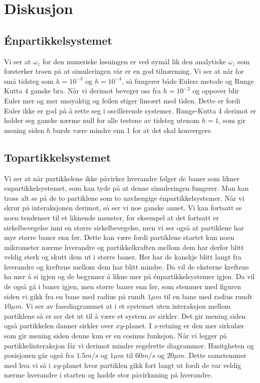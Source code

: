 \documentclass[reprint,english,notitlepage]{revtex4-1}  %
\begin{document}
\section{Diskusjon}
\subsection*{Énpartikkelsystemet}
Vi ser at $\omega_z$ for den numeriske løsningen er ved øymål lik den analytiske $\omega_z$ som forsterker troen på at simuleringen vår er en god tilnærming.
Vi ser at når for små tidsteg som $h=10^{-3}$ og $h=10^{-4}$, så fungerer både Eulers metode og Runge Kutta 4 ganske bra. Når vi derimot beveger oss fra $h=10^{-2}$ og oppover blir Euler mer og mer unøyaktig og feilen stiger lineært med tiden. Dette er fordi Euler ikke er god på å rette seg i oscillerende systemer.
\newline Runge-Kutta 4 derimot er holder seg ganske nærme null for alle testene av tidsteg utenom $h=1$, som gir mening siden $h$ burde være mindre enn 1 for at det skal konvergere.
\subsection*{Topartikkelsystemet}
Vi ser at når partikkelene ikke påvirker hverandre følger de baner som likner enpartikkelsystemet, som kan tyde på at denne simuleringen fungerer. Man kan tross alt se på de to partiklene som to uavhengige énpartikkelsystemer. Når vi skrur på interaksjonen derimot, så ser vi noe ganske annet. Vi kan fortsatt se noen tendenser til et liknende mønster, for eksempel at det fortsatt er sirkelbevegelse inni en større sirkelbevegelse, men vi ser også at partiklene har mye større baner enn før. Dette kan være fordi partiklene startet kun noen mikrometer nærme hverandre og partikkelkraften mellom dem har derfor blitt veldig sterk og skutt dem ut i større baner. Her har de kanskje blitt langt fra hverandre og kreftene mellom dem har blitt mindre. Da vil de eksterne kreftene ha mer å si igjen og de begynner å likne mer på énpartikkelsystemer igjen. Da vil de også gå i baner igjen, men større baner enn før, som stemmer med figuren siden vi gikk fra en bane med radius på rundt $1\mu m$ til en bane med radius rundt $10\mu m$.
\newline Vi ser av fasediagrammet at i et systemet uten interaksjon mellom partiklene så er ser det ut til å være et system av sirkler. Det gir mening siden også partikkelen danner sirkler over $xy$-planet. I $z$-retning er den mer sirkulær som gir mening siden denne kun er en cosinus funksjon. Når vi legger på partikkelinteraksjon får vi derimot mindre regelrette diagrammer. Hasitgheten og posisjonen går også fra $1.5m/s$ og $1\mu m$ til $60m/s$ og $20\mu m$. Dette samstemmer med hva vi så i $xy$-planet hvor partiklen gikk fort langt ut fordi de var veldig nærme hverandre i starten og hadde stor påvirknning på hverandre.
\end{document}
